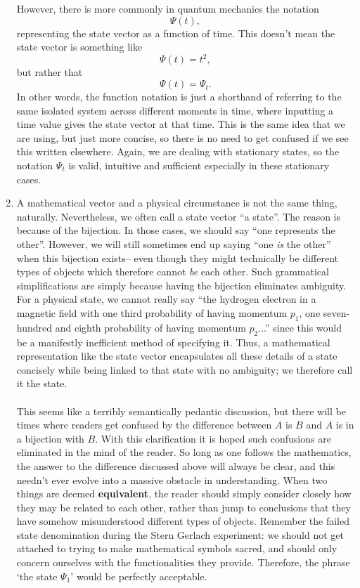 \begin{enumerate}
    \\\\
    However, there is more commonly in quantum mechanics the notation
    $$
    \Psi(t),
    $$
    representing the state vector as a function of time. This doesn't mean the state vector is something like 
    $$
    \Psi(t)=t^2,
    $$
    but rather that 
    $$
    \Psi(t)=\Psi_{t}.
    $$
    In other words, the function notation is just a shorthand of referring to the same isolated system across different moments in time, where inputting a time value gives the state vector at that time. This is the same idea that we are using, but just more concise, so there is no need to get confused if we see this written elsewhere. Again, we are dealing with stationary states, so the notation 
    $\Psi_{t}$ is valid, intuitive and sufficient especially in these stationary cases.
    \item A mathematical vector and a physical circumstance is not the same thing, naturally. Nevertheless, we often call a state vector ``a state''. The reason is because of the bijection. In those cases, we should say ``one represents the other''. However, we will still sometimes end up saying ``one \textit{is} the other'' when this bijection exists-- even though they might technically be different types of objects which therefore cannot \textit{be} each other. Such grammatical simplifications are simply because having the bijection eliminates ambiguity. For a physical state, we cannot really say ``the hydrogen electron in a magnetic field with one third probability of having momentum $p_{1}$, one seven-hundred and eighth probability of having momentum $p_{2}$...'' since this would be a manifestly inefficient method of specifying it. Thus, a mathematical representation like the state vector encapsulates all these details of a state concisely while being linked to that state with no ambiguity; we therefore call it the state.    
    \\\\
    This seems like a terribly semantically pedantic discussion, but there will be times where readers get confused by the difference between $A$ is $B$ and $A$ is in a bijection with $B$. With this clarification it is hoped such confusions are eliminated in the mind of the reader. So long as one follows the mathematics, the answer to the difference discussed above will always be clear, and this needn't ever evolve into a massive obstacle in understanding. When two things are deemed \textbf{equivalent}, the reader should simply consider closely how they may be related to each other, rather than jump to conclusions that they have somehow misunderstood different types of objects. Remember the failed state denomination during the Stern Gerlach experiment: we should not get attached to trying to make mathematical symbols sacred, and should only concern ourselves with the functionalities they provide. Therefore, the phrase `the state $\Psi_{1}$' would be perfectly acceptable.

\end{enumerate}
